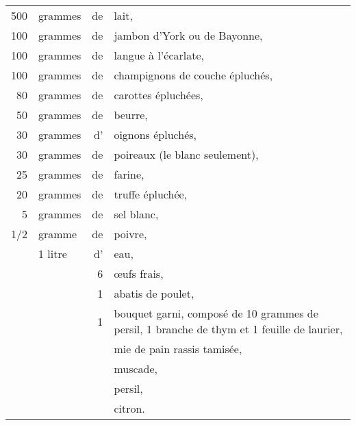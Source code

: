 \footnotesize
\begin{longtable}{rlrp{16em}}
  500 & grammes & de & lait,                                                                              \\
  100 & grammes & de & jambon d'York ou de Bayonne,                                                       \\
  100 & grammes & de & langue à l'écarlate,                                                               \\
  100 & grammes & de & champignons de couche épluchés,                                                    \\
   80 & grammes & de & carottes épluchées,                                                                \\
   50 & grammes & de & beurre,                                                                            \\
   30 & grammes & d' & oignons épluchés,                                                                  \\
   30 & grammes & de & poireaux (le blanc seulement),                                                     \\
   25 & grammes & de & farine,                                                                            \\
   20 & grammes & de & truffe épluchée,                                                                   \\
    5 & grammes & de & sel blanc,                                                                         \\
  1/2 & gramme  & de & poivre,                                                                            \\
      & 1 litre & d' & eau,                                                                               \\
      &         &  6 & œufs frais,                                                                        \\
      &         &  1 & abatis de poulet,                                                                  \\
      &         &  1 & bouquet garni, composé de 10 grammes de persil,
                       1 branche de thym et 1 feuille de laurier,                                         \\
      &         &    & mie de pain rassis tamisée,                                                        \\
      &         &    & muscade,                                                                           \\
      &         &    & persil,                                                                            \\
      &         &    & citron.                                                                            \\
\end{longtable}
\normalsize

